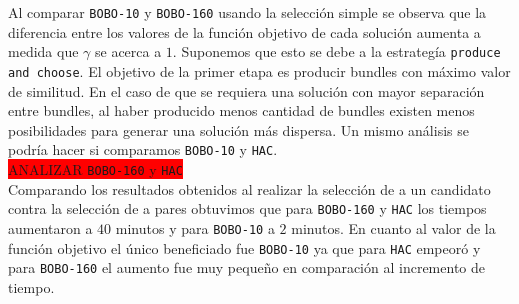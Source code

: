 Al comparar \texttt{BOBO-10} y \texttt{BOBO-160} usando la selección simple se observa que la 
diferencia entre los valores de la función objetivo de cada solución aumenta a medida que $\gamma$ 
se acerca a $1$. Suponemos que esto se debe a la estrategía \texttt{produce and choose}. El objetivo 
de la primer etapa es producir bundles con máximo valor de similitud. En el caso de que se requiera 
una solución con mayor separación entre bundles, al haber producido menos cantidad de bundles 
existen menos posibilidades para generar una solución más dispersa. Un mismo análisis se podría 
hacer si comparamos \texttt{BOBO-10} y \texttt{HAC}.\\
\colorbox{red}{ANALIZAR \texttt{BOBO-160} y \texttt{HAC}}\\
Comparando los resultados obtenidos al realizar la selección de a un candidato contra la selección 
de a pares obtuvimos que para \texttt{BOBO-160} y \texttt{HAC} los tiempos aumentaron a $40$ 
minutos y para \texttt{BOBO-10} a $2$ minutos. En cuanto al valor de la función objetivo el único 
beneficiado fue \texttt{BOBO-10} ya que para \texttt{HAC} empeoró y para \texttt{BOBO-160} el 
aumento fue muy pequeño en comparación al incremento de tiempo.
